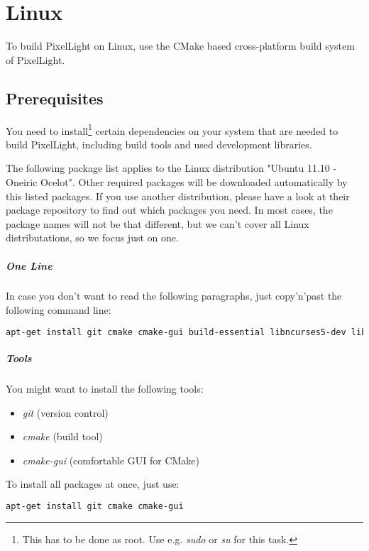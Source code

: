 \chapter{Linux}
To build PixelLight on Linux, use the CMake based cross-platform build system of PixelLight.




\section{Prerequisites}
You need to install\footnote{This has to be done as root. Use e.g. \emph{sudo} or \emph{su} for this task.} certain dependencies on your system that are needed to build PixelLight, including build tools and used development libraries.

The following package list applies to the Linux distribution "Ubuntu 11.10 - Oneiric Ocelot". Other required packages will be downloaded automatically by this listed packages. If you use another distribution, please have a look at their package repository to find out which packages you need. In most cases, the package names will not be that different, but we can't cover all Linux distributations, so we focus just on one.


\paragraph{One Line}
In case you don't want to read the following paragraphs, just copy'n'past the following command line:
\begin{lstlisting}[language=sh]
apt-get install git cmake cmake-gui build-essential libncurses5-dev libxext-dev libxcursor-dev libdbus-1-dev libxxf86vm-dev libxrandr-dev libglu1-mesa-dev doxygen graphviz texlive texlive-science
\end{lstlisting}


\paragraph{Tools}
You might want to install the following tools:
\begin{itemize}
\item{\emph{git} (version control)}
\item{\emph{cmake} (build tool)}
\item{\emph{cmake-gui} (comfortable GUI for CMake)}
\end{itemize}

To install all packages at once, just use: 
\begin{lstlisting}[language=sh]
apt-get install git cmake cmake-gui
\end{lstlisting}


